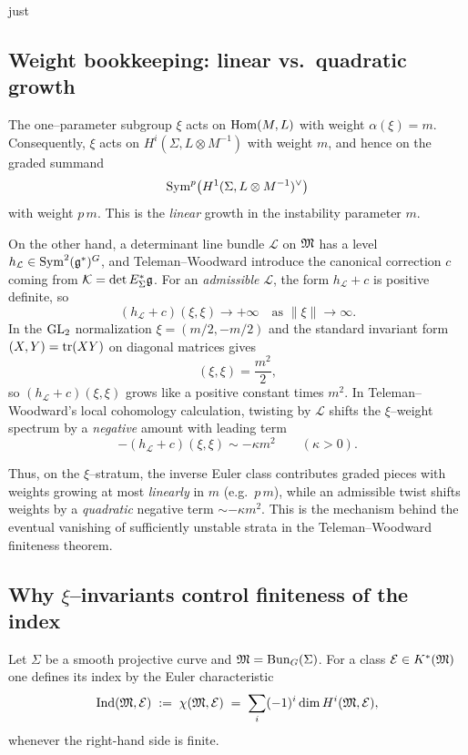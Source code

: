 just \documentclass[12pt]{article}
\DeclareMathOperator{\Ind}{Ind}
\begin{document}
\subsection{Weight bookkeeping: linear vs.\ quadratic growth}

The one--parameter subgroup $\xi$ acts on $\operatorname{Hom}(M,L)$ with weight $\alpha(\xi)=m$.
Consequently, $\xi$ acts on $H^i(\Sigma,L\otimes M^{-1})$ with weight $m$, and hence
on the graded summand
\[
\operatorname{Sym}^p\bigl(H^1(\Sigma,L\otimes M^{-1})^\vee\bigr)
\]
with weight $p\,m$.  This is the \emph{linear} growth in the instability parameter $m$.

On the other hand, a determinant line bundle $\mathcal L$ on $\mathfrak{M}$ has a
level $h_{\mathcal L}\in \operatorname{Sym}^2(\mathfrak{g}^*)^G$, and Teleman--Woodward introduce the
canonical correction $c$ coming from $\mathcal K=\det E_\Sigma^*\mathfrak{g}$.
For an \emph{admissible} $\mathcal L$, the form $h_{\mathcal L}+c$ is positive
definite, so
\[
(h_{\mathcal L}+c)(\xi,\xi)\to +\infty \quad\text{as } \|\xi\|\to\infty.
\]
In the $\operatorname{GL}_2$ normalization $\xi=(m/2,-m/2)$ and the standard invariant form
$(X,Y)=\operatorname{tr}(XY)$ on diagonal matrices gives
\[
(\xi,\xi)=\frac{m^2}{2},
\]
so $(h_{\mathcal L}+c)(\xi,\xi)$ grows like a positive constant times $m^2$.
In Teleman--Woodward's local cohomology calculation, twisting by $\mathcal L$
shifts the $\xi$--weight spectrum by a \emph{negative} amount with leading term
\[
-(h_{\mathcal L}+c)(\xi,\xi)\sim -\kappa m^2 \qquad (\kappa>0).
\]

Thus, on the $\xi$--stratum, the inverse Euler class contributes graded pieces with
weights growing at most \emph{linearly} in $m$ (e.g.\ $p\,m$), while an admissible
twist shifts weights by a \emph{quadratic} negative term $\sim-\kappa m^2$.
This is the mechanism behind the eventual vanishing of sufficiently unstable
strata in the Teleman--Woodward finiteness theorem.

\subsection*{Why $\xi$--invariants control finiteness of the index}

Let $\Sigma$ be a smooth projective curve and $\mathfrak{M}=\operatorname{Bun}_G(\Sigma)$.
For a class $\mathcal E\in K^*(\mathfrak{M})$ one defines its index by the Euler
characteristic
\[
\Ind(\mf M,\mathcal E)\;:=\;\chi(\mf M,\mathcal E)
\;=\;\sum_i(-1)^i\dim H^i(\mf M,\mathcal E),
\]
whenever the right-hand side is finite.
\end{document}
